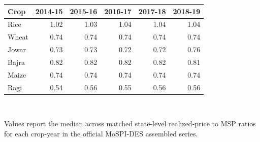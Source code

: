 \begin{small}
\begin{tabular}{lrrrrr}
\toprule
Crop & 2014-15 & 2015-16 & 2016-17 & 2017-18 & 2018-19 \\
\midrule
Rice & 1.02 & 1.03 & 1.04 & 1.04 & 1.04 \\
Wheat & 0.74 & 0.74 & 0.74 & 0.74 & 0.74 \\
Jowar & 0.73 & 0.73 & 0.72 & 0.72 & 0.76 \\
Bajra & 0.82 & 0.82 & 0.82 & 0.82 & 0.81 \\
Maize & 0.74 & 0.74 & 0.74 & 0.74 & 0.74 \\
Ragi & 0.54 & 0.56 & 0.55 & 0.56 & 0.56 \\
\bottomrule
\end{tabular}
\\[0.3em]
\parbox{0.95\linewidth}{\footnotesize Values report the median across matched state-level realized-price to MSP ratios for each crop-year in the official MoSPI-DES assembled series.}
\end{small}
